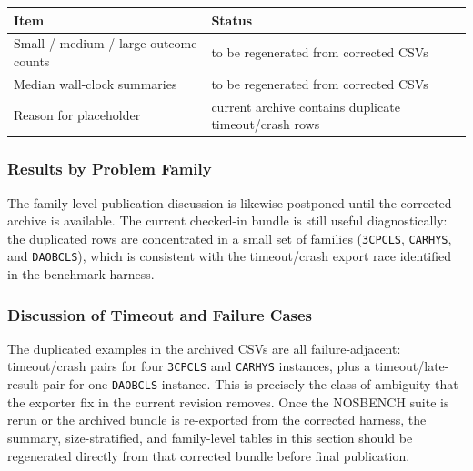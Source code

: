 \begin{table}[!htb]
{\begin{tabular}{@{}ll@{}}
\toprule
Item & Status \\
\midrule
Small / medium / large outcome counts & to be regenerated from corrected CSVs \\
Median wall-clock summaries & to be regenerated from corrected CSVs \\
Reason for placeholder & current archive contains duplicate timeout/crash rows \\
\bottomrule
\end{tabular}}
\label{tab:nosbench_size}
\end{table}


\subsubsection{Results by Problem Family}
\label{sec:nosbench_family}

The family-level publication discussion is likewise postponed until the
corrected archive is available.  The current checked-in bundle is still
useful diagnostically: the duplicated rows are concentrated in a small
set of families (\texttt{3CPCLS}, \texttt{CARHYS}, and
\texttt{DAOBCLS}), which is consistent with the timeout/crash export
race identified in the benchmark harness.

\subsubsection{Discussion of Timeout and Failure Cases}
\label{sec:nosbench_failures}

The duplicated examples in the archived CSVs are all failure-adjacent:
timeout/crash pairs for four \texttt{3CPCLS} and \texttt{CARHYS}
instances, plus a timeout/late-result pair for one \texttt{DAOBCLS}
instance.  This is precisely the class of ambiguity that the exporter
fix in the current revision removes.  Once the NOSBENCH suite is
rerun or the archived bundle is re-exported from the corrected harness,
the summary, size-stratified, and family-level tables in this section
should be regenerated directly from that corrected bundle before final
publication.


